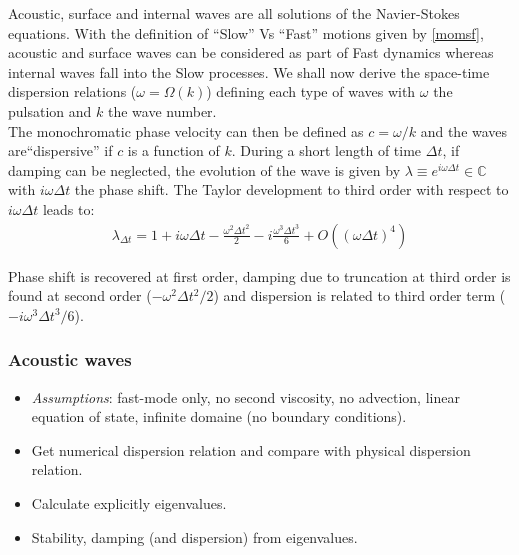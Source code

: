 \documentclass[a4paper,11pt]{article}
\begin{document}
Acoustic, surface and internal waves are all solutions of the Navier-Stokes equations. With the definition of ``Slow'' Vs ``Fast'' motions given by \ref{momsf}, acoustic and surface waves can be considered as part of Fast dynamics whereas internal waves fall into the Slow processes. We shall now derive the space-time dispersion relations ($\omega=\Omega(k)$) defining each type of waves with $\omega$ the pulsation and $k$ the wave number.\\
The monochromatic phase velocity can then be defined as $c=\omega / k$ and the waves are``dispersive'' if $c$ is a function of $k$. During a short length of time $\Delta t$, if damping can be neglected, the evolution of the wave is given by $\lambda \equiv e^{i \omega \Delta t} \in  \mathbb{C}$ with $i \omega \Delta t$ the phase shift. The Taylor development to third order with respect to $i\omega\Delta t$ leads to:
  \begin{equation}
    \label{lambda3}
    \begin{split}
      \displaystyle
      \lambda_{\Delta t}=1+i\omega\Delta{t}-\frac{\omega^2\Delta{t}^2}{2}
      -i\frac{\omega^3\Delta{t}^3}{6}+O((\omega\Delta{t})^4)
    \end{split}
    \end{equation}

Phase shift is recovered at first order, damping due to truncation at third order is found at second order ($-\omega^2\Delta{t}^2/2$) and dispersion is related to third order term ($-i\omega^3\Delta{t}^3/6$).
    
 \subsubsection{Acoustic waves}
 \begin{itemize}[label=\textbullet,font=\tiny]
   \item \textit{Assumptions}: fast-mode only, no second viscosity, no advection, linear equation of state, infinite domaine (no boundary conditions).
   \item Get numerical dispersion relation and compare with physical dispersion relation.
   \item Calculate explicitly eigenvalues.
   \item Stability, damping (and dispersion) from eigenvalues.\\
\end{itemize}
  
\end{document}
